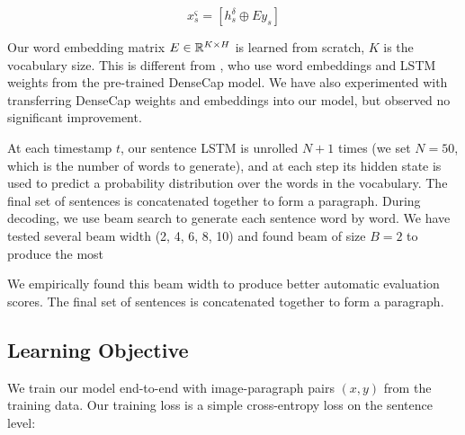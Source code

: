 \documentclass[11pt,a4paper]{article}
\newcommand{\R}{\mathbb{R}}
\begin{document}
\begin{equation}
   x^\varsigma_s = [h^\delta_s \oplus Ey_s ]
\end{equation}


Our word embedding matrix $E \in \R\sp{K \times H}$ is learned from scratch, $K$ is the vocabulary size.
This is different from , who use word embeddings and LSTM weights from the pre-trained DenseCap model. %
We have also experimented with transferring DenseCap weights and embeddings into our model, but observed no significant improvement.

At each timestamp $t$, our sentence LSTM is unrolled $N+1$ times (we set $N=50$, which is the number of words to generate), and at each step its hidden state is used to predict a probability distribution over the words in the vocabulary.
The final set of sentences is concatenated together to form a paragraph.
During decoding, we use beam search \cite{beam17} to generate each sentence word by word.
We have tested several beam width (2, 4, 6, 8, 10) and found beam of size $B=2$ to produce the most


We empirically found this beam width to produce better automatic evaluation scores.
The final set of sentences is concatenated together to form a paragraph.


\subsection{Learning Objective}
We train our model end-to-end with image-paragraph pairs $(x, y)$ from the training data.
Our training loss is a simple cross-entropy loss on the sentence level:
\end{document}
